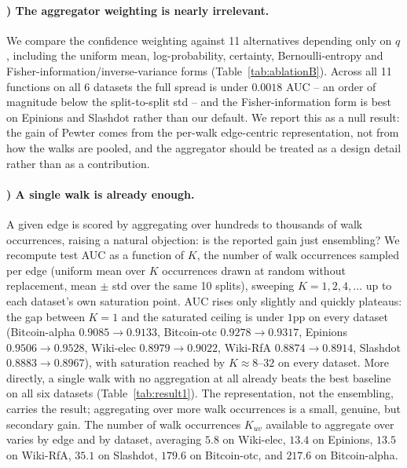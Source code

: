 \documentclass[sigconf, review, anonymous]{acmart}
\newcounter{ablation}
\renewcommand{\theablation}{\Alph{ablation}}
\theoremstyle{plain}
\theoremstyle{definition}
\begin{document}
\paragraph{\theablation) The aggregator weighting is nearly irrelevant.}
\label{abl:aggregator}
We compare the confidence weighting against 11 alternatives depending only on $q$, including the uniform mean, log-probability, certainty, Bernoulli-entropy and Fisher-information/inverse-variance forms (Table~\ref{tab:ablationB}). Across all 11 functions on all 6 datasets the full spread is under $0.0018$ AUC -- an order of magnitude below the split-to-split std -- and the Fisher-information form is best on Epinions and Slashdot rather than our default. We report this as a null result: the gain of Pewter comes from the per-walk edge-centric representation, not from how the walks are pooled, and the aggregator should be treated as a design detail rather than as a contribution.

\paragraph{\theablation) A single walk is already enough.}
\label{abl:singlewalk}
A given edge is scored by aggregating over hundreds to thousands of walk occurrences, raising a natural objection: is the reported gain just ensembling? We recompute test AUC as a function of $K$, the number of walk occurrences sampled per edge (uniform mean over $K$ occurrences drawn at random without replacement, mean $\pm$ std over the same 10 splits), sweeping $K=1,2,4,\ldots$ up to each dataset's own saturation point. AUC rises only slightly and quickly plateaus: the gap between $K=1$ and the saturated ceiling is under $1$pp on every dataset (Bitcoin-alpha $0.9085\to0.9133$, Bitcoin-otc $0.9278\to0.9317$, Epinions $0.9506\to0.9528$, Wiki-elec $0.8979\to0.9022$, Wiki-RfA $0.8874\to0.8914$, Slashdot $0.8883\to0.8967$), with saturation reached by $K\approx8$--$32$ on every dataset. More directly, a single walk with no aggregation at all already beats the best baseline on all six datasets (Table~\ref{tab:result1}). The representation, not the ensembling, carries the result; aggregating over more walk occurrences is a small, genuine, but secondary gain. The number of walk occurrences $K_{uv}$ available to aggregate over varies by edge and by dataset, averaging $5.8$ on Wiki-elec, $13.4$ on Epinions, $13.5$ on Wiki-RfA, $35.1$ on Slashdot, $179.6$ on Bitcoin-otc, and $217.6$ on Bitcoin-alpha.
\end{document}
